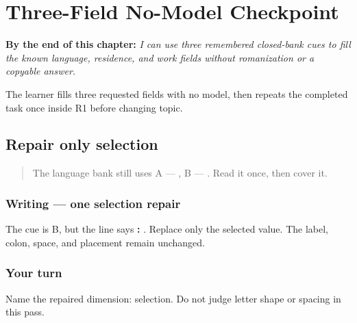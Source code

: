 
\chapter{Three-Field No-Model Checkpoint}
\label{ch:pa-form-three-checkpoint}

\begin{chapteropening}
\textbf{By the end of this chapter:} \emph{I can use three remembered closed-bank cues to fill the known language, residence, and work fields without romanization or a copyable answer.}

The learner fills three requested fields with no model, then repeats the completed task once inside R1 before changing topic.
\end{chapteropening}

\section[\texorpdfstring{B — \pa{ਭਾਸ਼ਾ}: \pa{ਹਿੰਦੀ} (three-field …)}{B — ਭਾਸ਼ਾ: ਹਿੰਦੀ (three-field …)}]{Repair only selection}

\label{lesson:PA-W06-selection-repair}



\begin{quote}
The language bank still uses A — \textbf{}, B — \textbf{}. Read it once, then cover it.
\end{quote}

\subsection*{Writing — one selection repair}
The cue is B, but the line says \textbf{: }. Replace only the selected value. The label, colon, space, and placement remain unchanged.

\subsection*{Your turn}
Name the repaired dimension: selection. Do not judge letter shape or spacing in this pass.

